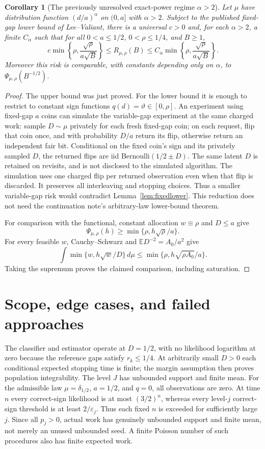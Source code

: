 \documentclass[11pt]{article}
\newtheorem{corollary}[theorem]{Corollary}
\newcommand{\E}{\mathbb E}
\begin{document}
\begin{corollary}[The previously unresolved exact-power regime $\alpha>2$]\label{cor:power}
Let $\mu$ have distribution function $(d/a)^\alpha$ on $(0,a]$ with $\alpha>2$.
Subject to the published fixed-gap lower bound of Lee--Valiant, there is a
universal $c>0$ and, for each $\alpha>2$, a finite $C_\alpha$ such that for all
$0<a\le1/2$, $0<\rho\le1/4$, and $B\ge1$,
\[
 c\min\left\{\rho,\frac{\sqrt\rho}{a\sqrt B}\right\}
 \le R_{\mu,\rho}(B)
 \le C_\alpha\min\left\{\rho,\frac{\sqrt\rho}{a\sqrt B}\right\}.
\]
Moreover this risk is comparable, with constants depending only on $\alpha$,
to $\Psi_{\mu,\rho}(B^{-1/2})$.
\end{corollary}
\begin{proof}
The upper bound was just proved. For the lower bound it is enough to restrict
to constant sign functions $q(d)=\vartheta\in[0,\rho]$. An experiment using
fixed-gap $a$ coins can simulate the variable-gap experiment at the same charged
work: sample $D\sim\mu$ privately for each fresh fixed-gap coin; on each request,
flip that coin once, and with probability $D/a$ return its flip, otherwise
return an independent fair bit. Conditional on the fixed coin's sign and its
privately sampled $D$, the
returned flips are iid Bernoulli$(1/2\pm D)$. The same latent $D$ is retained
on revisits, and is not disclosed to the simulated algorithm. The simulation
uses one charged flip per returned observation even when that flip is discarded.
It preserves all interleaving and stopping choices. Thus a smaller variable-gap
risk would contradict Lemma~\ref{lem:fixedlower}. This reduction does not need
the continuation note's arbitrary-law lower-bound theorem.

For comparison with the functional, constant allocation $w\equiv\rho$ and
$D\le a$ give
\[
 \Psi_{\mu,\rho}(h)\ge\min\{\rho,h\sqrt\rho/a\}.
\]
For every feasible $w$, Cauchy--Schwarz and $\E D^{-2}=A_0/a^2$ give
\[
 \int\min\{w,h\sqrt w/D\}\,d\mu
 \le\min\{\rho,h\sqrt{\rho A_0}/a\}.
\]
Taking the supremum proves the claimed comparison, including saturation.
\end{proof}

\section{Scope, edge cases, and failed approaches}
The classifier and estimator operate at $D=1/2$, with no likelihood logarithm
at zero because the reference gaps satisfy $r_k\le1/4$. At arbitrarily small
$D>0$ each conditional expected stopping time is finite; the margin assumption
then proves population integrability. The level $J$ has unbounded support and
finite mean. For the admissible law $\mu=\delta_{1/2}$, $a=1/2$, and $q=0$,
all observations are zero. At time $n$ every correct-sign likelihood is at most
$(3/2)^n$, whereas every level-$j$ correct-sign threshold is at least
$2/\varepsilon_j$. Thus each fixed $n$ is exceeded for sufficiently large $j$.
Since all $p_j>0$, actual work has genuinely unbounded support and finite mean,
not merely an unused unbounded seed. A finite Poisson number of such procedures
also has finite expected work.
\end{document}
